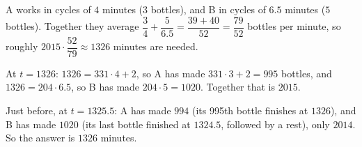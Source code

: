 A works in cycles of $4$ minutes ($3$ bottles), and B in cycles of $6.5$ minutes ($5$ bottles). Together they average $\dfrac34+\dfrac{5}{6.5}=\dfrac{39+40}{52}=\dfrac{79}{52}$ bottles per minute, so roughly $2015\cdot\dfrac{52}{79}\approx1326$ minutes are needed.

At $t=1326$: $1326=331\cdot4+2$, so A has made $331\cdot3+2=995$ bottles, and $1326=204\cdot6.5$, so B has made $204\cdot5=1020$. Together that is $2015$.

Just before, at $t=1325.5$: A has made $994$ (its 995th bottle finishes at $1326$), and B has made $1020$ (its last bottle finished at $1324.5$, followed by a rest), only $2014$. So the answer is $\boxed{1326}$ minutes.
